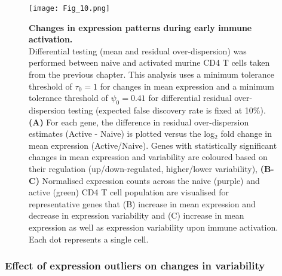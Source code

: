 \newpage


\begin{figure}[!h]
\centering
\texttt{[image: Fig\_10.png]}
\caption[Changes in expression patterns during early immune activation]{\textbf{Changes in expression patterns during early immune activation.}\\
Differential testing (mean and residual over-dispersion) was performed between naive and activated murine CD4\plus{} T cells taken from the previous chapter. 
This analysis uses a minimum tolerance threshold of $\tau_0=1$ for changes in mean expression and a minimum tolerance threshold of $\psi_0=0.41$ for differential residual over-dispersion testing (expected false discovery rate is fixed at 10\%). 
\textbf{(A)} For each gene, the difference in residual over-dispersion estimates (Active - Naive) is plotted versus the log$_2$ fold change in mean expression (Active/Naive). 
Genes with statistically significant changes in mean expression and variability are coloured based on their regulation (up/down-regulated, higher/lower variability), 
\textbf{(B-C)} Normalised expression counts across the naive (purple) and active (green) CD4\plus{} T cell population are visualised for representative genes that (B) increase in mean expression and decrease in expression variability and (C) increase in mean expression as well as expression variability  upon immune activation. 
Each dot represents a single cell.}
\label{fig2:immune_activation}
\end{figure}

\newpage

\subsubsection{Effect of expression outliers on changes in variability}

